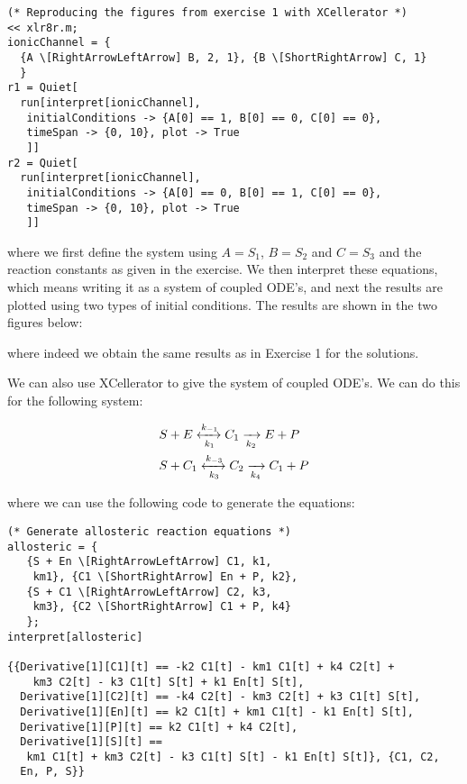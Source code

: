 \documentclass[11pt,a4paper,onecolumn]{article}
\begin{document}
\begin{lstlisting}[mathescape]
(* Reproducing the figures from exercise 1 with XCellerator *)
<< xlr8r.m;
ionicChannel = {
  {A \[RightArrowLeftArrow] B, 2, 1}, {B \[ShortRightArrow] C, 1}
  }
r1 = Quiet[
  run[interpret[ionicChannel], 
   initialConditions -> {A[0] == 1, B[0] == 0, C[0] == 0}, 
   timeSpan -> {0, 10}, plot -> True
   ]]
r2 = Quiet[
  run[interpret[ionicChannel], 
   initialConditions -> {A[0] == 0, B[0] == 1, C[0] == 0}, 
   timeSpan -> {0, 10}, plot -> True
   ]]
\end{lstlisting}

where we first define the system using $A = S_1$, $B = S_2$ and $C = S_3$ and the reaction constants as given in the exercise. We then interpret these equations, which means writing it as a system of coupled ODE's, and next the results are plotted using two types of initial conditions. The results are shown in the two figures below:

\begin{figure}[H]
  \centering
\end{figure}

where indeed we obtain the same results as in Exercise 1 for the solutions.

We can also use XCellerator to give the system of coupled ODE's. We can do this for the following system:

\begin{align*}
  &S + E \xleftrightarrow[k_1]{k_{-1}} C_1 \xrightarrow[k_2]{} E + P \nonumber \\
  &S + C_1 \xleftrightarrow[k_3]{k_{-3}} C_2 \xrightarrow[k_4]{} C_1 + P \nonumber 
\end{align*}

where we can use the following code to generate the equations:

\begin{lstlisting}[mathescape]
(* Generate allosteric reaction equations *)
allosteric = {
   {S + En \[RightArrowLeftArrow] C1, k1, 
    km1}, {C1 \[ShortRightArrow] En + P, k2},
   {S + C1 \[RightArrowLeftArrow] C2, k3, 
    km3}, {C2 \[ShortRightArrow] C1 + P, k4}
   };
interpret[allosteric]

{{Derivative[1][C1][t] == -k2 C1[t] - km1 C1[t] + k4 C2[t] + 
    km3 C2[t] - k3 C1[t] S[t] + k1 En[t] S[t], 
  Derivative[1][C2][t] == -k4 C2[t] - km3 C2[t] + k3 C1[t] S[t], 
  Derivative[1][En][t] == k2 C1[t] + km1 C1[t] - k1 En[t] S[t], 
  Derivative[1][P][t] == k2 C1[t] + k4 C2[t], 
  Derivative[1][S][t] == 
   km1 C1[t] + km3 C2[t] - k3 C1[t] S[t] - k1 En[t] S[t]}, {C1, C2, 
  En, P, S}}
\end{lstlisting}
\end{document}
